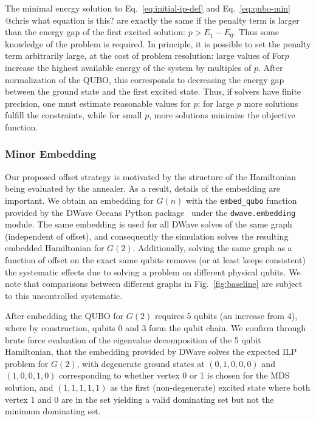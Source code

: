 \documentclass[prd,twocolumn,tightenlines,preprintnumbers,showpacs,superscriptaddress,notitlepage,nofootinbib,eqsecnum,floatfix,longbibliography,aps,10pt]{revtex4-2}
\begin{document}
The minimal energy solution to Eq.~\eqref{eq:initial-ip-def} and Eq.~\eqref{eq:qubo-min} {\color{red}@chris what equation is this?} are exactly the same if the penalty term is larger than the energy gap of the first excited solution: $p > E_1 - E_0$.
Thus some knowledge of the problem is required.
In principle, it is possible to set the penalty term arbitrarily large, at the cost of problem resolution: large values of For$p$ increase the highest available energy of the system by multiples of $p$.
After normalization of the QUBO, this corresponds to decreasing the energy gap between the ground state and the first excited state.
Thus, if solvers have finite precision, one must estimate reasonable values for $p$: for large $p$ more solutions fulfill the constraints, while for small $p$, more solutions minimize the objective function.

\subsubsection{Minor Embedding}
\label{sec:methods:minor_embedding}
Our proposed offset strategy is motivated by the structure of the Hamiltonian being evaluated by the annealer.
As a result, details of the embedding are important. We obtain an embedding for $G(n)$ with the \texttt{embed\_qubo} function provided by the DWave Oceans Python package~\cite{dwave_oceans} under the \texttt{dwave.embedding} module.
The same embedding is used for all DWave solves of the same graph (independent of offset), and consequently the simulation solves the resulting embedded Hamiltonian for $G(2)$.
Additionally, solving the same graph as a function of offset on the exact same qubits removes (or at least keeps consistent) the systematic effects due to solving a problem on different physical qubits.
We note that comparisons between different graphs in Fig.~\ref{fig:baseline} are subject to this uncontrolled systematic.

After embedding the QUBO for $G(2)$ requires 5 qubits (an increase from 4), where by construction, qubits 0 and 3 form the qubit chain.
We confirm through brute force evaluation of the eigenvalue decomposition of the 5 qubit Hamiltonian, that the embedding provided by DWave solves the expected ILP problem for $G(2)$, with degenerate ground states at $(0, 1, 0, 0, 0)$ and $(1, 0, 0, 1, 0)$ corresponding to whether vertex 0 or 1 is chosen for the MDS solution, and $(1, 1, 1, 1, 1)$ as the first (non-degenerate) excited state where both vertex 1 and 0 are in the set yielding a valid dominating set but not the minimum dominating set.
\end{document}
